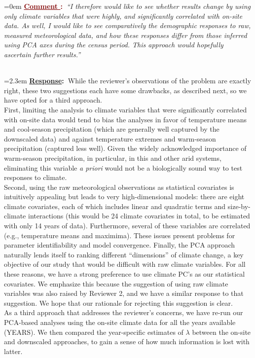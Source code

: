 \documentclass[12pt]{article}
\newcounter{cN}
\newcommand{\comment}[1]{
	\vspace{2em}
	\refstepcounter{cN} %
	\noindent \hangindent=0em \textbf{\textcolor{Maroon}{\uline{Comment \thecN}:~}}\emph{``#1''}
	}
\newcommand{\response}[1]{
	\\[0.25em]
	\hangindent=2.3em \textbf{\textcolor{NavyBlue}{\uline{Response}:~}}#1
	}
\begin{document}
\comment{I therefore would like to see whether results change by using only climate variables that were highly, and significantly correlated with on-site data. As well, I would like to see comparatively the demographic responses to raw, measured meteorological data, and how these responses differ from those inferred using PCA axes during the census period. 
This approach would hopefully ascertain further results.}
\response{While the reviewer's observations of the problem are exactly right, these two suggestions each have some drawbacks, as described next, so we have opted for a third approach. 
\\
First, limiting the analysis to climate variables that were significantly correlated with on-site data would tend to bias the analyses in favor of temperature means and cool-season precipitation (which are generally well captured by the downscaled data) and against temperature extremes and warm-season precipitation (captured less well). 
Given the widely acknowledged importance of warm-season precipitation, in particular, in this and other arid systems, eliminating this variable \textit{a priori} would not be a biologically sound way to test responses to climate. 
\\
Second, using the raw meteorological observations as statistical covariates is intuitively appealing but leads to very high-dimensional models: there are eight climate covariates, each of which includes linear and quadratic terms and size-by-climate interactions (this would be 24 climate covariates in total, to be estimated with only 14 years of data).
Furthermore, several of these variables are correlated (e.g., temperature means and maximima). 
These issues present problems for parameter identifiability and model convergence.
Finally, the PCA approach naturally lends itself to ranking different ``dimensions'' of climate change, a key objective of our study that would be difficult with raw climate variables. 
For all these reasons, we have a strong preference to use climate PC's as our statistical covariates. 
We emphasize this because the suggestion of using raw climate variables was also raised by Reviewer 2, and we have a similar response to that suggestion. 
We hope that our rationale for rejecting this suggestion is clear. 
\\
As a third approach that addresses the reviewer's concerns, we have re-run our PCA-based analyses using the on-site climate data for all the years available (YEARS). 
We then compared the year-specific estimates of $\lambda$ between the on-site and downscaled approaches, to gain a sense of how much information is lost with latter. 
}
\end{document}
